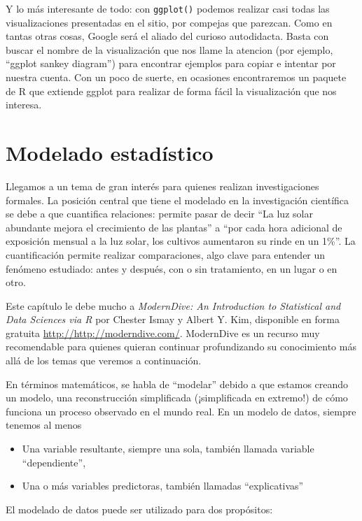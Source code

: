 \documentclass[]{book}
\providecommand{\tightlist}{%
  \setlength{\itemsep}{0pt}\setlength{\parskip}{0pt}}
\begin{document}
Y lo más interesante de todo: con \texttt{ggplot()} podemos realizar
casi todas las visualizaciones presentadas en el sitio, por compejas que
parezcan. Como en tantas otras cosas, Google será el aliado del curioso
autodidacta. Basta con buscar el nombre de la visualización que nos
llame la atencion (por ejemplo, ``ggplot sankey diagram'') para
encontrar ejemplos para copiar e intentar por nuestra cuenta. Con un
poco de suerte, en ocasiones encontraremos un paquete de R que extiende
ggplot para realizar de forma fácil la visualización que nos interesa.

\chapter{Modelado estadístico}\label{modelado-estadistico}

Llegamos a un tema de gran interés para quienes realizan investigaciones
formales. La posición central que tiene el modelado en la investigación
científica se debe a que cuantifica relaciones: permite pasar de decir
``La luz solar abundante mejora el crecimiento de las plantas'' a ``por
cada hora adicional de exposición mensual a la luz solar, los cultivos
aumentaron su rinde en un 1\%''. La cuantificación permite realizar
comparaciones, algo clave para entender un fenómeno estudiado: antes y
después, con o sin tratamiento, en un lugar o en otro.

Este capítulo le debe mucho a \emph{ModernDive: An Introduction to
Statistical and Data Sciences via R} por Chester Ismay y Albert Y. Kim,
disponible en forma gratuita \url{http://http://moderndive.com/}.
ModernDive es un recurso muy recomendable para quienes quieran continuar
profundizando su conocimiento más allá de los temas que veremos a
continuación.

En términos matemáticos, se habla de ``modelar'' debido a que estamos
creando un modelo, una reconstrucción simplificada (¡simplificada en
extremo!) de cómo funciona un proceso observado en el mundo real. En un
modelo de datos, siempre tenemos al menos

\begin{itemize}
\tightlist
\item
  Una variable resultante, siempre una sola, también llamada variable
  ``dependiente'',
\item
  Una o más variables predictoras, también llamadas ``explicativas''
\end{itemize}

El modelado de datos puede ser utilizado para dos propósitos:
\end{document}
